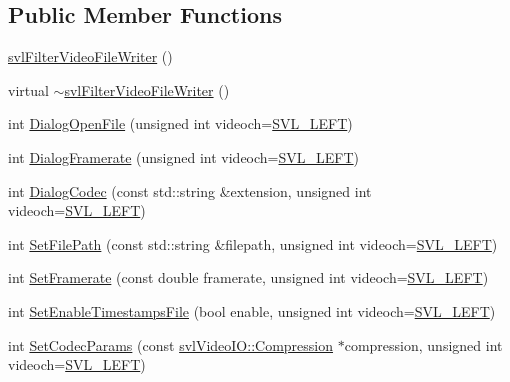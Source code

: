 \subsection*{Public Member Functions}
\begin{DoxyCompactItemize}
\item 
\hyperlink{classsvl_filter_video_file_writer_a7cb8c3711718de9ffd602f81065f6e5c}{svl\-Filter\-Video\-File\-Writer} ()
\item 
virtual \hyperlink{classsvl_filter_video_file_writer_ab542ac7e2964917731fb5f7a81c51784}{$\sim$svl\-Filter\-Video\-File\-Writer} ()
\item 
int \hyperlink{classsvl_filter_video_file_writer_a645354ebe26075c536c40d96a21d0b57}{Dialog\-Open\-File} (unsigned int videoch=\hyperlink{svl_definitions_8h_ab9fec7615f19c8df2919eebcab0b187f}{S\-V\-L\-\_\-\-L\-E\-F\-T})
\item 
int \hyperlink{classsvl_filter_video_file_writer_ab2402531da4b90c86d02909b09490c11}{Dialog\-Framerate} (unsigned int videoch=\hyperlink{svl_definitions_8h_ab9fec7615f19c8df2919eebcab0b187f}{S\-V\-L\-\_\-\-L\-E\-F\-T})
\item 
int \hyperlink{classsvl_filter_video_file_writer_ac5ac1ec7510b3cbb6ee68cc1001f03cb}{Dialog\-Codec} (const std\-::string \&extension, unsigned int videoch=\hyperlink{svl_definitions_8h_ab9fec7615f19c8df2919eebcab0b187f}{S\-V\-L\-\_\-\-L\-E\-F\-T})
\item 
int \hyperlink{classsvl_filter_video_file_writer_aac4ce3a343f6854736bcd01c3a25932c}{Set\-File\-Path} (const std\-::string \&filepath, unsigned int videoch=\hyperlink{svl_definitions_8h_ab9fec7615f19c8df2919eebcab0b187f}{S\-V\-L\-\_\-\-L\-E\-F\-T})
\item 
int \hyperlink{classsvl_filter_video_file_writer_a5a923dacfa6b410d89b2cb953cbd77fe}{Set\-Framerate} (const double framerate, unsigned int videoch=\hyperlink{svl_definitions_8h_ab9fec7615f19c8df2919eebcab0b187f}{S\-V\-L\-\_\-\-L\-E\-F\-T})
\item 
int \hyperlink{classsvl_filter_video_file_writer_a371997677225a6f91225f62208931dc7}{Set\-Enable\-Timestamps\-File} (bool enable, unsigned int videoch=\hyperlink{svl_definitions_8h_ab9fec7615f19c8df2919eebcab0b187f}{S\-V\-L\-\_\-\-L\-E\-F\-T})
\item 
int \hyperlink{classsvl_filter_video_file_writer_a0828bbb3806a4fd2d03fe21f612b50e3}{Set\-Codec\-Params} (const \hyperlink{classsvl_video_i_o_a932d071ec9be4fefde824ab9b9125282}{svl\-Video\-I\-O\-::\-Compression} $\ast$compression, unsigned int videoch=\hyperlink{svl_definitions_8h_ab9fec7615f19c8df2919eebcab0b187f}{S\-V\-L\-\_\-\-L\-E\-F\-T})

\end{DoxyCompactItemize}

